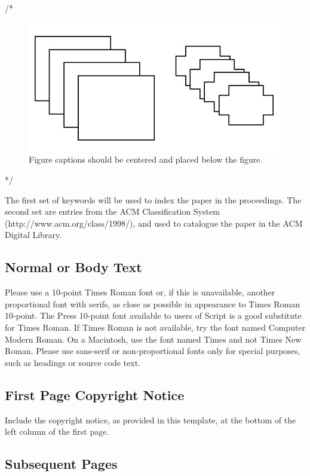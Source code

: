 \documentclass{ubicomp2013}
\begin{document}
/*
\begin{figure}[t]
\begin{center}
\includegraphics[width=0.90\columnwidth]{sample-fig.jpg}
\end{center}
\caption{Figure captions should be centered and placed below the
figure.}
\end{figure}
*/

The first set of keywords will be used to index the paper in the
proceedings. The second set are entries from the ACM Classification
System
(http://www.acm.org/class/1998/), and used to catalogue the paper in the ACM
Digital Library.

\subsection{Normal or Body Text}

Please use a 10-point Times Roman font or, if this is unavailable,
another proportional font with serifs, as close as possible in
appearance to Times Roman 10-point. The Press 10-point font available
to users of Script is a good substitute for Times Roman. If Times
Roman is not available, try the font named Computer Modern Roman. On a
Macintosh, use the font named Times and not Times New Roman. Please
use sans-serif or non-proportional fonts only for special purposes,
such as headings or source code text.

\subsection{First Page Copyright Notice}

Include the copyright notice, as provided in this template, at the bottom of the left column of the first page.
\subsection{Subsequent Pages}
\end{document}

